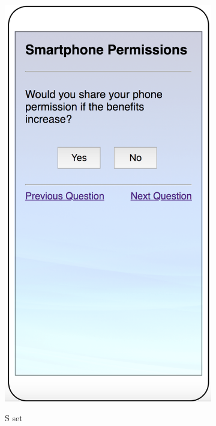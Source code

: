 \begin{figure}
\begin{subfigure}[b]{0.24\textheight}
		\includegraphics[width=0.24\textheight]{figures/indirect3.png}
		\label{fig:indirectc}
		\caption{S set}
	\end{subfigure}
	\begin{subfigure}[b]{0.24\textheight}

\end{subfigure}
\end{figure}
